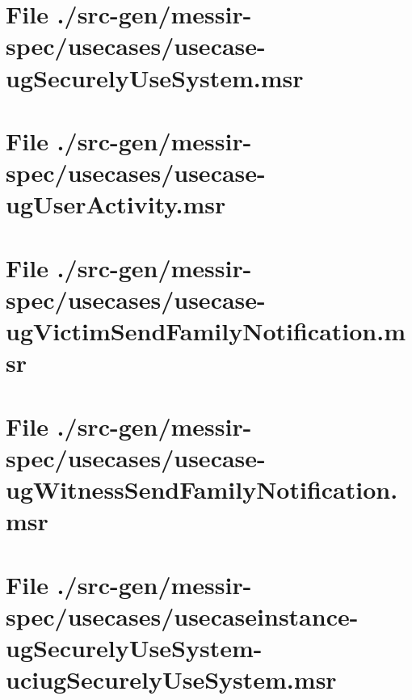 \section[File /src-gen/messir-spec/usecases/usecase-ugSecurelyUseSystem.msr]{File ./src-gen/messir-spec/usecases/usecase-ugSecurelyUseSystem.msr}
\scriptsize

\normalsize
	
\section[File /src-gen/messir-spec/usecases/usecase-ugUserActivity.msr]{File ./src-gen/messir-spec/usecases/usecase-ugUserActivity.msr}
\scriptsize

\normalsize
	
\section[File /src-gen/messir-spec/usecases/usecase-ugVictimSendFamilyNotification.msr]{File ./src-gen/messir-spec/usecases/usecase-ugVictimSendFamilyNotification.msr}
\scriptsize

\normalsize
	
\section[File /src-gen/messir-spec/usecases/usecase-ugWitnessSendFamilyNotification.msr]{File ./src-gen/messir-spec/usecases/usecase-ugWitnessSendFamilyNotification.msr}
\scriptsize

\normalsize
	
\section[File /src-gen.../usecaseinstance-ugSecurelyUseSystem-uciugSecurelyUseSystem.msr]{File ./src-gen/messir-spec/usecases/usecaseinstance-ugSecurelyUseSystem-uciugSecurelyUseSystem.msr}
\scriptsize

\normalsize
	

